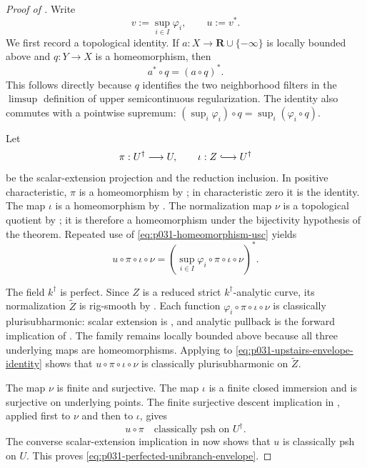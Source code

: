 \begin{proof}[Proof of
]
Write
\[
                  v:=\sup_{i\in I}\varphi_i,
                  \qquad u:=v^*.
\]
We first record a topological identity.  If \(a:X\to
\mathbf R\cup\{-\infty\}\) is locally bounded above and
\(q:Y\to X\) is a homeomorphism, then
\begin{equation}
\label{eq:p031-homeomorphism-usc}
                          a^*\circ q=(a\circ q)^*.
\end{equation}
This follows directly because \(q\) identifies the two neighborhood
filters in the \(\limsup\) definition of upper semicontinuous
regularization.  The identity also commutes with a pointwise supremum:
\((\sup_i\varphi_i)\circ q=\sup_i(\varphi_i\circ q)\).

Let
\[
 \pi:U^\dagger\longrightarrow U,
 \qquad
 \iota:Z\lhook\joinrel\longrightarrow U^\dagger
\]
be the scalar-extension projection and the reduction inclusion.  In
positive characteristic, \(\pi\) is a homeomorphism by
\cite[Lemma~3.7]{GR25Classical}; in characteristic zero it is the identity.
The map \(\iota\) is a homeomorphism by
\cite[Lemma~3.8]{GR25Classical}.  The normalization map \(\nu\) is a
topological quotient by \cite[Lemma~3.9(4)]{GR25Classical}; it is therefore
a homeomorphism under the bijectivity hypothesis of the theorem.
Repeated use of \eqref{eq:p031-homeomorphism-usc} yields
\begin{equation}
\label{eq:p031-upstairs-envelope-identity}
 u\circ\pi\circ\iota\circ\nu
 =
 \left(
   \sup_{i\in I}\varphi_i\circ\pi\circ\iota\circ\nu
 \right)^*.
\end{equation}

The field \(k^\dagger\) is perfect.  Since \(Z\) is a reduced strict
\(k^\dagger\)-analytic curve, its normalization \(\widetilde Z\) is
rig-smooth by \cite[Lemma~3.9(1)]{GR25Classical}.  Each function
\(\varphi_i\circ\pi\circ\iota\circ\nu\) is classically
plurisubharmonic: scalar extension is
\cite[Proposition~4.2(5)]{GR25Classical}, and analytic pullback is the
forward implication of \cite[Proposition~4.2(6)]{GR25Classical}.  The
family remains locally bounded above because all three underlying maps are
homeomorphisms.  Applying
 to
\eqref{eq:p031-upstairs-envelope-identity} shows that
\(u\circ\pi\circ\iota\circ\nu\) is classically plurisubharmonic on
\(\widetilde Z\).

The map \(\nu\) is finite and surjective.  The map \(\iota\) is a finite
closed immersion and is surjective on underlying points.  The finite
surjective descent implication in
\cite[Proposition~4.2(6)]{GR25Classical}, applied first to \(\nu\) and then
to \(\iota\), gives
\[
                         u\circ\pi
                         \quad\text{classically psh on }U^\dagger.
\]
The converse scalar-extension implication in
\cite[Proposition~4.2(5)]{GR25Classical} now shows that \(u\) is
classically psh on \(U\).  This proves
\eqref{eq:p031-perfected-unibranch-envelope}.


\end{proof}
